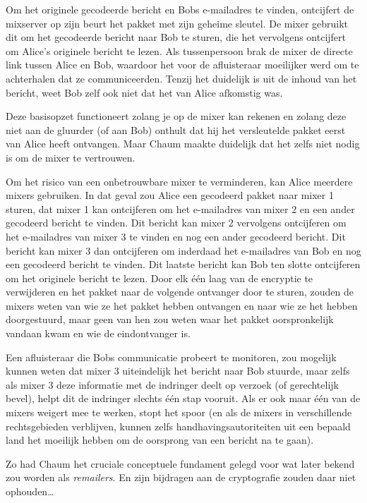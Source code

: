 \documentclass[
  a5paper,
  smalldemyvopaper,11pt,twoside,onecolumn,openright,extrafontsizes,
hidelinks]{memoir}
\begin{document}
Om het originele gecodeerde bericht en Bobs e-mailadres te vinden,
ontcijfert de mixserver op zijn beurt het pakket met zijn geheime
sleutel. De mixer gebruikt dit om het gecodeerde bericht naar Bob te
sturen, die het vervolgens ontcijfert om Alice's originele bericht te
lezen. Als tussenpersoon brak de mixer de directe link tussen Alice en
Bob, waardoor het voor de afluisteraar moeilijker werd om te achterhalen
dat ze communiceerden. Tenzij het duidelijk is uit de inhoud van het
bericht, weet Bob zelf ook niet dat het van Alice afkomstig was.

Deze basisopzet functioneert zolang je op de mixer kan rekenen en zolang
deze niet aan de gluurder (of aan Bob) onthult dat hij het versleutelde
pakket eerst van Alice heeft ontvangen. Maar Chaum maakte duidelijk dat
het zelfs niet nodig is om de mixer te vertrouwen.

Om het risico van een onbetrouwbare mixer te verminderen, kan Alice
meerdere mixers gebruiken. In dat geval zou Alice een gecodeerd pakket
naar mixer 1 sturen, dat mixer 1 kan ontcijferen om het e-mailadres van
mixer 2 en een ander gecodeerd bericht te vinden. Dit bericht kan mixer
2 vervolgens ontcijferen om het e-mailadres van mixer 3 te vinden en nog
een ander gecodeerd bericht. Dit bericht kan mixer 3 dan ontcijferen om
inderdaad het e-mailadres van Bob en nog een gecodeerd bericht te
vinden. Dit laatste bericht kan Bob ten slotte ontcijferen om het
originele bericht te lezen. Door elk één laag van de encryptie te
verwijderen en het pakket naar de volgende ontvanger door te sturen,
zouden de mixers weten van wie ze het pakket hebben ontvangen en naar
wie ze het hebben doorgestuurd, maar geen van hen zou weten waar het
pakket oorspronkelijk vandaan kwam en wie de eindontvanger is.

Een afluisteraar die Bobs communicatie probeert te monitoren, zou
mogelijk kunnen weten dat mixer 3 uiteindelijk het bericht naar Bob
stuurde, maar zelfs als mixer 3 deze informatie met de indringer deelt
op verzoek (of gerechtelijk bevel), helpt dit de indringer slechts één
stap vooruit. Als er ook maar één van de mixers weigert mee te werken,
stopt het spoor (en als de mixers in verschillende rechtsgebieden
verblijven, kunnen zelfs handhavingsautoriteiten uit een bepaald land
het moeilijk hebben om de oorsprong van een bericht na te gaan).

Zo had Chaum het cruciale conceptuele fundament gelegd voor wat later
bekend zou worden als \emph{remailers}. En zijn bijdragen aan de cryptografie zouden daar niet ophouden\ldots{}
\end{document}

